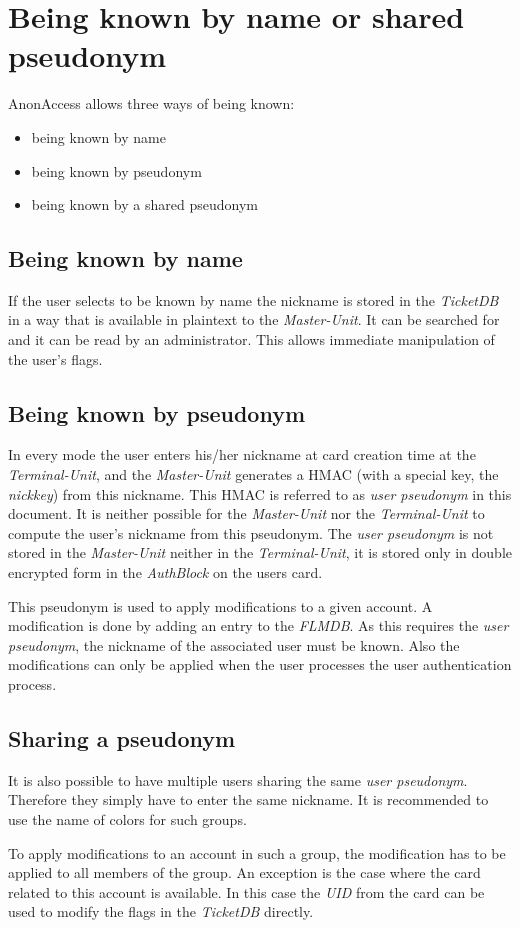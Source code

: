 \section{Being known by name or shared pseudonym}
AnonAccess allows three ways of being known:
\begin{itemize}
\item being known by name
\item being known by pseudonym
\item being known by a shared pseudonym
\end{itemize}

\subsection{Being known by name}
If the user selects to be known by name the nickname is stored in the \textit{TicketDB} in a way that is available in plaintext to the \textit{Master-Unit}. It can be searched for and it can be read by an administrator. This allows immediate manipulation of the user's flags.

\subsection{Being known by pseudonym}
In every mode the user enters his/her nickname at card creation time at the \textit{Terminal-Unit}, and the \textit{Master-Unit} generates a HMAC (with a special key, the \textit{nickkey}) from this nickname. This HMAC is referred to as \textit{user pseudonym} in this document. It is neither possible for the \textit{Master-Unit} nor the \textit{Terminal-Unit} to compute the user's nickname from this pseudonym. The \textit{user pseudonym} is not stored in the \textit{Master-Unit} neither in the \textit{Terminal-Unit}, it is stored only in double encrypted form in the \textit{AuthBlock} on the users card.

This pseudonym is used to apply modifications to a given account. A modification is done by adding an entry to the \textit{FLMDB}. As this requires the \textit{user pseudonym}, the nickname of the associated user must be known. Also the modifications can only be applied when the user processes the user authentication process.

\subsection{Sharing a pseudonym}
It is also possible to have multiple users sharing the same \textit{user pseudonym}. Therefore they simply have to enter the same nickname. It is recommended to use the name of colors for such groups.

To apply modifications to an account in such a group, the modification has to be applied to all members of the group. An exception is the case where the card related to this account is available. In this case the \textit{UID} from the card can be used to modify the flags in the \textit{TicketDB} directly.
